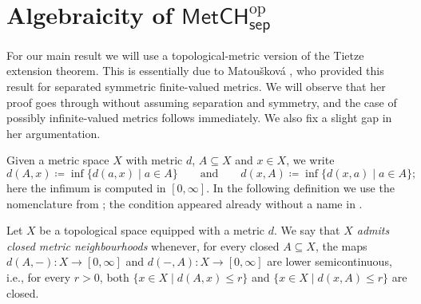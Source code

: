 \documentclass[11pt]{amsart}
\theoremstyle{definition}
\newcommand{\cat}[1]{\mathsf{#1}}
\newcommand{\op}{\mathrm{op}}
\newcommand{\MetCHsepop}{\cat{MetCH}_\cat{sep}^\op}
\begin{document}
\section{Algebraicity of \texorpdfstring{$\MetCHsepop$}{MetCH-sep (opposite)}}

For our main result we will use a topological-metric version of the Tietze extension theorem.
This is essentially due to Matou\v{s}kov\'a \cite[Thm.~2.4]{Mat00}, who provided this result for separated symmetric finite-valued metrics.
We will observe that her proof goes through without assuming separation and symmetry, and the case of possibly infinite-valued metrics follows immediately.
We also fix a slight gap in her argumentation.

Given a metric space $X$ with metric $d$, $A \subseteq X$ and $x \in X$, we write
\begin{displaymath}
    d(A, x) \coloneqq \inf\{d(a, x) \mid a \in A\}
  \qquad\text{and}\qquad
    d(x, A) \coloneqq \inf\{d(x, a) \mid a \in A\};
\end{displaymath}
here the infimum is computed in $[0, \infty]$. In the following definition we use the nomenclature from \cite{BenYaacov2008,BenYaacov2013}; the condition appeared already without a name in \cite{Mat00}.

\begin{definition}
  Let $X$ be a topological space equipped with a metric $d$. We say that \emph{$X$ admits closed metric neighbourhoods} whenever, for every closed $A\subseteq X$, the maps \(d(A,-)\colon X\to [0,\infty]\) and \(d(-,A)\colon X\to [0,\infty]\) are lower semicontinuous, i.e., for every $r>0$, both $\{x\in X\mid d(A,x)\leq r\}$ and $\{x\in X\mid d(x,A)\leq r\}$ are closed.
\end{definition}
\end{document}
